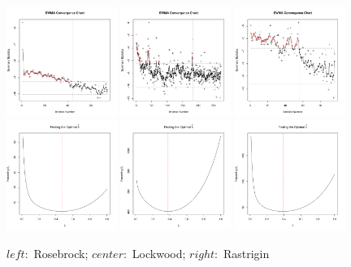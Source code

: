 \documentclass[12pt]{article}
\begin{document}
%
%
\begin{figure}
\includegraphics[width=0.32\textwidth]{./figures/ewmaConvChartRoseEasyEasyOpt.pdf}
\includegraphics[width=0.32\textwidth]{./figures/ewmaConvChartLock6Three20000Opt.pdf}
\includegraphics[width=0.32\textwidth]{./figures/ewmaConvChartRastHardOpt.pdf}
\includegraphics[width=0.32\textwidth]{./figures/ssRoseEasyEasyOpt.pdf}
\includegraphics[width=0.32\textwidth]{./figures/ssLock6Three20000Opt.pdf}
\includegraphics[width=0.32\textwidth]{./figures/ssRastHardOpt.pdf}
\caption{$left:$ Rosebrock; $center:$ Lockwood; $right:$ Rastrigin}
\end{figure}
%
%
\end{document}
